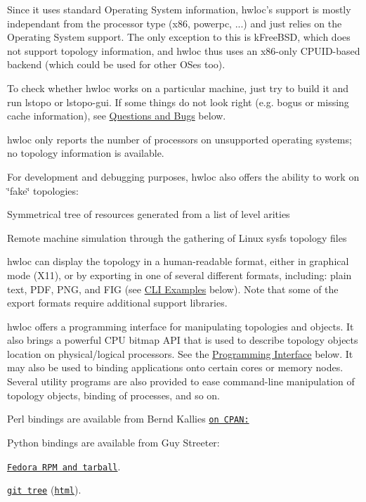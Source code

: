 Since it uses standard Operating System information, hwloc's support is mostly independant from the processor type (x86, powerpc, ...) and just relies on the Operating System support. The only exception to this is kFreeBSD, which does not support topology information, and hwloc thus uses an x86-\/only CPUID-\/based backend (which could be used for other OSes too).

To check whether hwloc works on a particular machine, just try to build it and run {\ttfamily lstopo} or {\ttfamily lstopo-\/gui}. If some things do not look right (e.g. bogus or missing cache information), see \hyperlink{index_bugs}{Questions and Bugs} below.

hwloc only reports the number of processors on unsupported operating systems; no topology information is available.

For development and debugging purposes, hwloc also offers the ability to work on \char`\"{}fake\char`\"{} topologies:


\begin{DoxyItemize}
\item Symmetrical tree of resources generated from a list of level arities 
\item Remote machine simulation through the gathering of Linux sysfs topology files 
\end{DoxyItemize}

hwloc can display the topology in a human-\/readable format, either in graphical mode (X11), or by exporting in one of several different formats, including: plain text, PDF, PNG, and FIG (see \hyperlink{index_cli_examples}{CLI Examples} below). Note that some of the export formats require additional support libraries.

hwloc offers a programming interface for manipulating topologies and objects. It also brings a powerful CPU bitmap API that is used to describe topology objects location on physical/logical processors. See the \hyperlink{index_interface}{Programming Interface} below. It may also be used to binding applications onto certain cores or memory nodes. Several utility programs are also provided to ease command-\/line manipulation of topology objects, binding of processes, and so on.

Perl bindings are available from Bernd Kallies \href{http://search.cpan.org/~bka/Sys-Hwloc-0.10/}{\tt on CPAN:}

Python bindings are available from Guy Streeter: 
\begin{DoxyItemize}
\item \href{http://people.redhat.com/streeter/}{\tt Fedora RPM and tarball}. 
\item \href{git://git.fedorahosted.org/python-hwloc.git}{\tt git tree} (\href{http://git.fedorahosted.org/git/python-hwloc.git}{\tt html}). 
\end{DoxyItemize}

